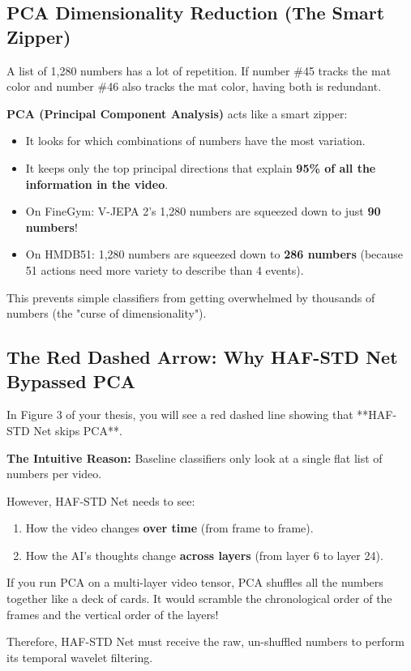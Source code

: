 \documentclass[a4paper, 11pt]{article}
\begin{document}
\subsection{PCA Dimensionality Reduction (The Smart Zipper)}
\begin{examplebox}
A list of 1,280 numbers has a lot of repetition. If number \#45 tracks the mat color and number \#46 also tracks the mat color, having both is redundant.

\textbf{PCA (Principal Component Analysis)} acts like a smart zipper:
\begin{itemize}
    \item It looks for which combinations of numbers have the most variation.
    \item It keeps only the top principal directions that explain \textbf{95\% of all the information in the video}.
    \item On FineGym: V-JEPA 2's 1,280 numbers are squeezed down to just \textbf{90 numbers}!
    \item On HMDB51: 1,280 numbers are squeezed down to \textbf{286 numbers} (because 51 actions need more variety to describe than 4 events).
\end{itemize}
This prevents simple classifiers from getting overwhelmed by thousands of numbers (the "curse of dimensionality").
\end{examplebox}

\subsection{The Red Dashed Arrow: Why HAF-STD Net Bypassed PCA}
\begin{conceptbox}
In Figure 3 of your thesis, you will see a red dashed line showing that **HAF-STD Net skips PCA**. 

\textbf{The Intuitive Reason:}
Baseline classifiers only look at a single flat list of numbers per video. 

However, HAF-STD Net needs to see:
\begin{enumerate}
    \item How the video changes \textbf{over time} (from frame to frame).
    \item How the AI's thoughts change \textbf{across layers} (from layer 6 to layer 24).
\end{enumerate}
If you run PCA on a multi-layer video tensor, PCA shuffles all the numbers together like a deck of cards. It would scramble the chronological order of the frames and the vertical order of the layers! 

Therefore, HAF-STD Net must receive the raw, un-shuffled numbers to perform its temporal wavelet filtering.
\end{conceptbox}
\end{document}
